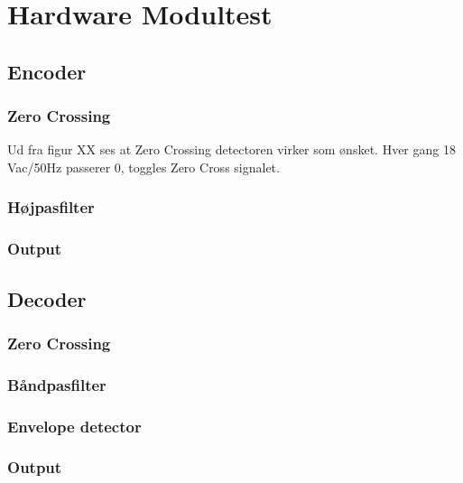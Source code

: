\chapter{Hardware Modultest}

\section{Encoder}




\subsection{Zero Crossing}

Ud fra figur XX ses at Zero Crossing detectoren virker som ønsket. Hver gang 18 Vac/50Hz passerer 0, toggles Zero Cross signalet. 

\subsection{Højpasfilter}

\subsection{Output}

\section{Decoder}

\subsection{Zero Crossing}


\subsection{Båndpasfilter}

\subsection{Envelope detector}

\subsection{Output}


\clearpage